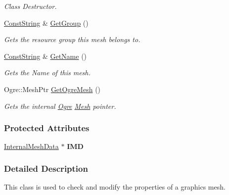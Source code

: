 \begin{DoxyCompactItemize}
\begin{DoxyCompactList}\small\item\em Class Destructor. \item\end{DoxyCompactList}\item 
\hyperlink{namespaceMezzanine_a63cd699ac54b73953f35ec9cfc05e506}{ConstString} \& \hyperlink{classMezzanine_1_1Mesh_a80cbbce88eed766feee7cdf9f71d1039}{GetGroup} ()
\begin{DoxyCompactList}\small\item\em Gets the resource group this mesh belongs to. \item\end{DoxyCompactList}\item 
\hyperlink{namespaceMezzanine_a63cd699ac54b73953f35ec9cfc05e506}{ConstString} \& \hyperlink{classMezzanine_1_1Mesh_a47c1bc6949e55f122b4bef9d8b99ca6d}{GetName} ()
\begin{DoxyCompactList}\small\item\em Gets the Name of this mesh. \item\end{DoxyCompactList}\item 
Ogre::MeshPtr \hyperlink{classMezzanine_1_1Mesh_aee175d130655986fb4a4b2a3b92ec4bf}{GetOgreMesh} ()
\begin{DoxyCompactList}\small\item\em Gets the internal \hyperlink{namespaceOgre}{Ogre} \hyperlink{classMezzanine_1_1Mesh}{Mesh} pointer. \item\end{DoxyCompactList}\end{DoxyCompactItemize}
\subsubsection*{Protected Attributes}
\begin{DoxyCompactItemize}
\item 
\hypertarget{classMezzanine_1_1Mesh_a6fef320ea8d04492b4b8b8e9f4a213c9}{
\hyperlink{classMezzanine_1_1InternalMeshData}{InternalMeshData} $\ast$ {\bfseries IMD}}
\label{classMezzanine_1_1Mesh_a6fef320ea8d04492b4b8b8e9f4a213c9}

\end{DoxyCompactItemize}


\subsubsection{Detailed Description}
This class is used to check and modify the properties of a graphics mesh. 

